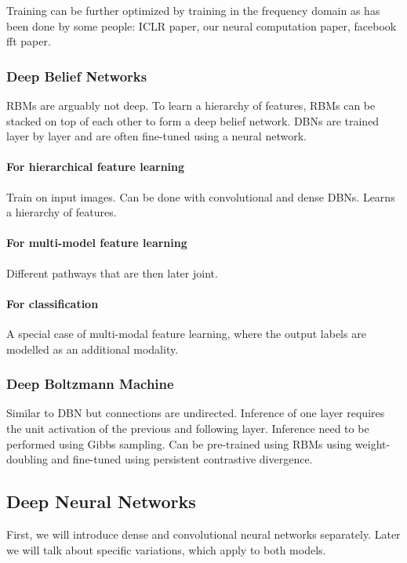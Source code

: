 \documentclass{report}
\begin{document}
Training can be further optimized by training in the frequency domain as has
been done by some people: ICLR paper, our neural computation paper, facebook fft
paper.

\subsubsection{Deep Belief Networks}

RBMs are arguably not deep. To learn a hierarchy of features, RBMs can be
stacked on top of each other to form a deep belief network. DBNs are trained
layer by layer and are often fine-tuned using a neural network.

\paragraph{For hierarchical feature learning}
Train on input images. Can be done with convolutional and dense DBNs. Learns a
hierarchy of features.

\paragraph{For multi-model feature learning}
Different pathways that are then later joint.

\paragraph{For classification}
A special case of multi-modal feature learning, where the output labels are
modelled as an additional modality.

\subsubsection{Deep Boltzmann Machine}

Similar to DBN but connections are undirected. Inference of one layer requires
the unit activation of the previous and following layer. Inference need to be
performed using Gibbs sampling. Can be pre-trained using RBMs using
weight-doubling and fine-tuned using persistent contrastive divergence.

\subsection{Deep Neural Networks}

First, we will introduce dense and convolutional neural networks separately.
Later we will talk about specific variations, which apply to both models.
\end{document}
